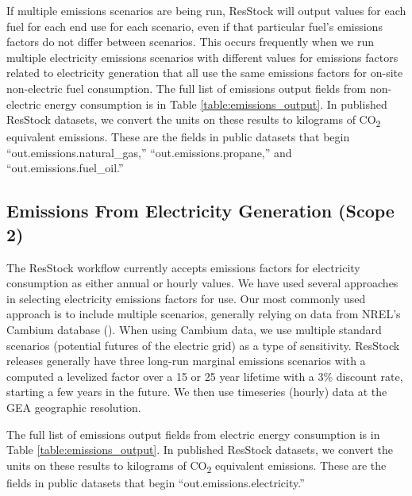 If multiple emissions scenarios are being run, ResStock will output values for each fuel for each end use for each scenario, even if that particular fuel's emissions factors do not differ between scenarios. This occurs frequently when we run multiple electricity emissions scenarios with different values for emissions factors related to electricity generation that all use the same emissions factors for on-site non-electric fuel consumption. The full list of emissions output fields from non-electric energy consumption is in Table \ref{table:emissions_output}. In published ResStock datasets, we convert the units on these results to kilograms of CO\textsubscript{2} equivalent emissions. These are the fields in public datasets that begin ``out.emissions.natural\_gas,'' ``out.emissions.propane,'' and ``out.emissions.fuel\_oil.''

\subsection{Emissions From Electricity Generation (Scope 2)}
The ResStock workflow currently accepts emissions factors for electricity consumption as either annual or hourly values. We have used several approaches in selecting electricity emissions factors for use. Our most commonly used approach is to include multiple scenarios, generally relying on data from NREL's Cambium database (\cite{Cambium2023}). When using Cambium data, we use multiple standard scenarios (potential futures of the electric grid) as a type of sensitivity. ResStock releases generally have three long-run marginal emissions scenarios with a computed a levelized factor over a 15 or 25 year lifetime with a 3\% discount rate, starting a few years in the future. We then use timeseries (hourly) data at the GEA geographic resolution. 

The full list of emissions output fields from electric energy consumption is in Table \ref{table:emissions_output}. In published ResStock datasets, we convert the units on these results to kilograms of CO\textsubscript{2} equivalent emissions. These are the fields in public datasets that begin ``out.emissions.electricity.''


